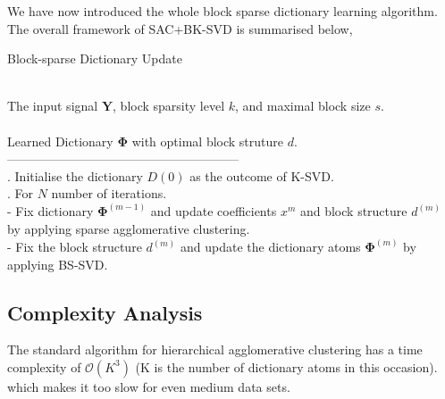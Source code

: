 We have now introduced the whole block sparse dictionary learning algorithm. The overall framework of SAC+BK-SVD is summarised below,
\begin{algorithm}[!htbp] 
\caption{Block-sparse Dictionary Update}
\label{alg:Framwork} 
\begin{algorithmic}
\REQUIRE ~~\\%
The input signal $\mathbf{Y}$, block sparsity level $k$, and maximal block size $s$.\\
\ENSURE ~~\\ %
Learned Dictionary $\mathbf{\Phi}$ with optimal block struture $d$.\\
--------------------------------------------------------\\
. Initialise the dictionary $D(0)$ as the outcome of K-SVD.\\
. For $N$ number of iterations.\\
\STATE \quad - Fix dictionary $\mathbf{\Phi}^{(m-1)}$ and update coefficients $x^{m}$ and block structure $d^{(m)}$ by applying sparse agglomerative clustering.\\
\STATE \quad - Fix the block structure $d^(m)$ and update the dictionary atoms $\mathbf{\Phi}^{(m)}$ by applying BS-SVD.\\
\end{algorithmic}
\end{algorithm}

\subsection{Complexity Analysis}
The standard algorithm for hierarchical agglomerative clustering has a time complexity of ${\displaystyle {\mathcal {O}}(K^{3})}$ (K is the number of dictionary atoms in this occasion). which makes it too slow for even medium data sets.
\clearpage
